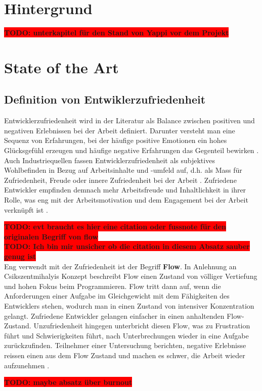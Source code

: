 \documentclass[12pt,a4paper]{report}
\newcommand{\todo}[1]{\colorbox{red}{\textbf{TODO: #1}}\\}
\begin{document}
\chapter{Hintergrund}
\todo{unterkapitel für den Stand von Yappi vor dem Projekt}

\chapter{State of the Art}
\section{Definition von Entwiklerzufriedenheit}

Entwicklerzufriedenheit wird in der Literatur als Balance zwischen positiven und negativen Erlebnissen bei der
Arbeit definiert. Darunter versteht man eine Sequenz von Erfahrungen, bei der häufige positive Emotionen ein
hohes Glücksgefühl erzeugen und häufige negative Erfahrungen das Gegenteil bewirken \cite{sadowski_happiness_2019}.
Auch Industriequellen fassen Entwicklerzufriedenheit als subjektives Wohlbefinden in Bezug auf Arbeitsinhalte
und -umfeld auf, d.h. als Mass für Zufriedenheit, Freude oder innere Zufriedenheit bei der Arbeit \cite{zenhub_2022_nodate}.
Zufriedene Entwickler empfinden demnach mehr Arbeitsfreude und Inhaltlichkeit in ihrer Rolle, was eng mit
der Arbeitsmotivation und dem Engagement bei der Arbeit verknüpft ist \cite{franca_motivation_2020}.

\todo{evt braucht es hier eine citation oder fussnote für den originalen Begriff von flow}
\todo{Ich bin mir unsicher ob die citation in diesem Absatz sauber genug ist}
Eng verwendt mit der Zufriedenheit ist der Begriff \textbf{Flow}. In Anlehnung an Csikszentmihalyis Konzept beschreibt
Flow einen Zustand von völliger Vertiefung und hohen Fokus beim Programmieren. Flow tritt dann auf, wenn die Anforderungen
einer Aufgabe im Gleichgewicht mit dem Fähigkeiten des Entwicklers stehen, wodurch man in einen Zustand von intensiver 
Konzentration gelangt. Zufriedene Entwickler gelangen einfacher in einen anhaltenden Flow-Zustand. Unzufriedenheit
hingegen unterbricht diesen Flow, was zu Frustration führt und Schwierigkeiten führt, nach Unterbrechungen wieder in
eine Aufgabe zurückzufinden. Teilnehmer einer Untersuchung berichten, negative Erlebnisse reissen einen aus dem Flow
Zustand und machen es schwer, die Arbeit wieder aufzunehmen \cite{sadowski_happiness_2019}.

\todo{maybe absatz über burnout}
\end{document}
